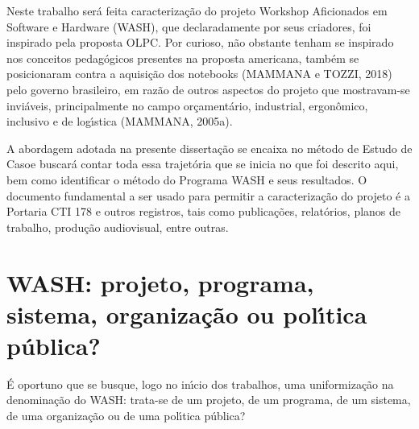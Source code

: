 \documentclass[
12pt,		%
openright,	%
twoside,  %
a4paper,			%
chapter=TITLE,		%
english,			%
french,				%
spanish,			%
brazil				%
]{USPSC-classe/USPSC}
\begin{document}
Neste trabalho ser\'a feita caracteriza\c{c}\~ao do projeto Workshop Aficionados em Software e Hardware (WASH), que declaradamente por seus criadores, foi inspirado pela proposta OLPC. Por curioso, n\~ao obstante tenham se inspirado nos conceitos pedag\'ogicos presentes na proposta americana, tamb\'em se posicionaram contra a aquisi\c{c}\~ao dos notebooks  (MAMMANA e TOZZI, 2018) pelo governo brasileiro, em raz\~ao de outros aspectos do projeto que mostravam-se invi\'aveis, principalmente no campo or\c{c}ament\'ario, industrial, ergon\^omico, inclusivo e de log\'{\i}stica  (MAMMANA, 2005a).

















A abordagem adotada na presente disserta\c{c}\~ao se encaixa no m\'etodo de \textquotedbl Estudo de Caso\textquotedbl  e buscar\'a contar toda essa trajet\'oria que se inicia no que foi descrito aqui, bem como identificar o m\'etodo do Programa WASH e seus resultados. O documento fundamental a ser usado para permitir a caracteriza\c{c}\~ao do projeto \'e a Portaria CTI 178 e outros registros, tais como publica\c{c}\~oes, relat\'orios, planos de trabalho, produ\c{c}\~ao audiovisual, entre outras.

















\section[WASH: projeto, programa, sistema, organiza\c{c}\~ao ou pol\'{\i}tica p\'ublica?]{WASH: projeto, programa, sistema, organiza\c{c}\~ao ou pol\'{\i}tica p\'ublica?}\label{WASH: projeto, programa, sistema, organiza\c{c}\~ao ou pol\'{\i}tica p\'ublica?}
\'E oportuno que se busque, logo no in\'{\i}cio dos trabalhos, uma uniformiza\c{c}\~ao na denomina\c{c}\~ao do WASH: trata-se de um projeto, de um programa, de um sistema, de uma organiza\c{c}\~ao ou de uma pol\'{\i}tica p\'ublica?
\end{document}
